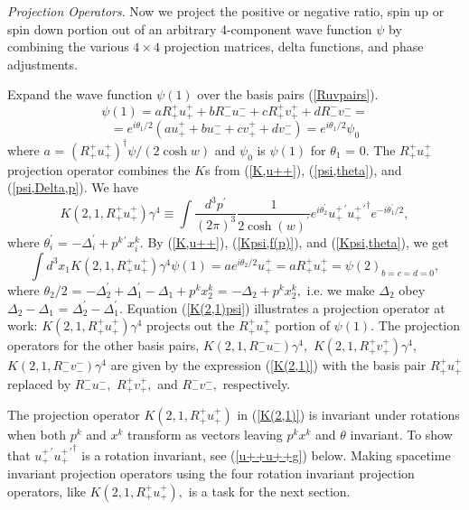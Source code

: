 \documentclass[a4paper,12pt]{article}
\begin{document}
	{\textit{Projection Operators}}. Now we project the positive or negative ratio, spin up or spin down portion out of an arbitrary 4-component wave function $\psi$ by combining the various  $4 \times 4$ projection matrices, delta functions, and phase adjustments.  

	Expand the wave function $\psi(1)$ over the basis pairs (\ref{Ruvpairs}). 
\begin{equation}	\label{psi(1),theta}
\psi(1) = a R_{+}^{+} u_{+}^{+} + bR_{-}^{-} u_{-}^{-} + cR_{+}^{+} v_{+}^{+} + dR_{-}^{-} v_{-}^{-} =
\end{equation}  
$$
 =  e^{i \theta_{1} / 2}(a  u_{+}^{+}  + b  u_{-}^{-} + c  v_{+}^{+}  + d  v_{-}^{-}) = e^{i \theta_{1} / 2} \psi_{0}
$$
where $a$ = ${(R_{+}^{+} u_{+}^{+})}^{\dagger} \psi / (2 \cosh{w})$ and $\psi_{0}$ is $\psi(1)$ for $\theta_{1}$ = 0. The $R_{+}^{+} u_{+}^{+}$ projection operator combines the $K$s from (\ref{K,u++}), (\ref{psi,theta}), and (\ref{psi,Delta,p}). We have
\begin{equation}	\label{K(2,1)}
  K(2,1,R_{+}^{+} u_{+}^{+}) \gamma^{4} \equiv \int \frac{d^3 p^{\prime} }{(2 \pi)^3} \frac{1}{2 {\cosh{(w)}}^{\prime}}e^{i \theta_{2}^{\prime}}  u_{+}^{+ \, \prime} {u_{+}^{+ \, \prime }}^{\dagger} e^{ -i \theta_{1}^{\prime}/2} ,
\end{equation} 
where $\theta_{i}^{\prime}$ = $- \Delta_{i}^{\prime} + p^{k \, \prime} x_{i}^{k}.$  By (\ref{K,u++}), (\ref{Kpsi,f(p)}), and (\ref{Kpsi,theta}), we get 
\begin{equation}	\label{K(2,1)psi}
 \int d^{3} x_{1} K(2,1,R_{+}^{+} u_{+}^{+}) \gamma^{4} \psi(1) = a e^{i \theta_{2} / 2} u_{+}^{+} = aR_{+}^{+} u_{+}^{+} = \psi(2)_{b=c=d=0},
\end{equation} 
where $ \theta_{2}/2 $ = $- \Delta_{2}^{\prime} + \Delta_{1}^{\prime} - \Delta_{1} + p^{k } x_{2}^{k} $ = $- \Delta_{2} + p^{k } x_{2}^{k},$ i.e. we make $\Delta_{2}$ obey $\Delta_{2} - \Delta_{1}$ = $\Delta_{2}^{\prime} - \Delta_{1}^{\prime}.$  Equation (\ref{K(2,1)psi}) illustrates a projection operator at work: $K(2,1,R_{+}^{+} u_{+}^{+}) \gamma^{4}$ projects out the $R_{+}^{+} u_{+}^{+}$ portion of $\psi(1).$ The projection operators for the other basis pairs, $K(2,1,R_{-}^{-}u_{-}^{-})\gamma^{4},$ $K(2,1,R_{+}^{+}v_{+}^{+})\gamma^{4},$ $K(2,1,R_{-}^{-}v_{-}^{-})\gamma^{4}$ are given by the expression (\ref{K(2,1)}) with the basis pair $R_{+}^{+} u_{+}^{+}$ replaced by $R_{-}^{-}u_{-}^{-},$ $R_{+}^{+}v_{+}^{+},$ and $R_{-}^{-}v_{-}^{-},$ respectively.

	The projection operator $K(2,1,R_{+}^{+} u_{+}^{+})$ in (\ref{K(2,1)}) is invariant under rotations when both $p^{k}$ and $x^{k}$ transform as vectors leaving $p^{k} x^{k}$ and $\theta$ invariant. To show that $u_{+}^{+ \, \prime} {u_{+}^{+ \, \prime }}^{\dagger}$ is a rotation invariant, see (\ref{u++u++g}) below. Making spacetime invariant projection operators using the four rotation invariant projection operators, like $K(2,1,R_{+}^{+} u_{+}^{+}),$ is a task for the next section.
\end{document}
